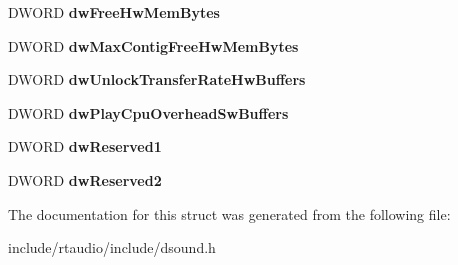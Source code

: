\begin{DoxyCompactItemize}
\item 
D\+W\+O\+RD {\bfseries dw\+Free\+Hw\+Mem\+Bytes}\hypertarget{struct___d_s_c_a_p_s_aed2d2047b3c1380dbba020990bbb1a7e}{}\label{struct___d_s_c_a_p_s_aed2d2047b3c1380dbba020990bbb1a7e}

\item 
D\+W\+O\+RD {\bfseries dw\+Max\+Contig\+Free\+Hw\+Mem\+Bytes}\hypertarget{struct___d_s_c_a_p_s_a095c40b0ea7be9112cfe2fae808bfe43}{}\label{struct___d_s_c_a_p_s_a095c40b0ea7be9112cfe2fae808bfe43}

\item 
D\+W\+O\+RD {\bfseries dw\+Unlock\+Transfer\+Rate\+Hw\+Buffers}\hypertarget{struct___d_s_c_a_p_s_a1105d8ad609201f60fe180e7e8dcf79d}{}\label{struct___d_s_c_a_p_s_a1105d8ad609201f60fe180e7e8dcf79d}

\item 
D\+W\+O\+RD {\bfseries dw\+Play\+Cpu\+Overhead\+Sw\+Buffers}\hypertarget{struct___d_s_c_a_p_s_ab8f763d65125d4cd199c1c5717b3bac1}{}\label{struct___d_s_c_a_p_s_ab8f763d65125d4cd199c1c5717b3bac1}

\item 
D\+W\+O\+RD {\bfseries dw\+Reserved1}\hypertarget{struct___d_s_c_a_p_s_ac320197e7a13ccd5d96718353946bbd1}{}\label{struct___d_s_c_a_p_s_ac320197e7a13ccd5d96718353946bbd1}

\item 
D\+W\+O\+RD {\bfseries dw\+Reserved2}\hypertarget{struct___d_s_c_a_p_s_a24b7cb27382ad4de4f991689c27d09cf}{}\label{struct___d_s_c_a_p_s_a24b7cb27382ad4de4f991689c27d09cf}

\end{DoxyCompactItemize}


The documentation for this struct was generated from the following file\+:\begin{DoxyCompactItemize}
\item 
include/rtaudio/include/dsound.\+h\end{DoxyCompactItemize}
